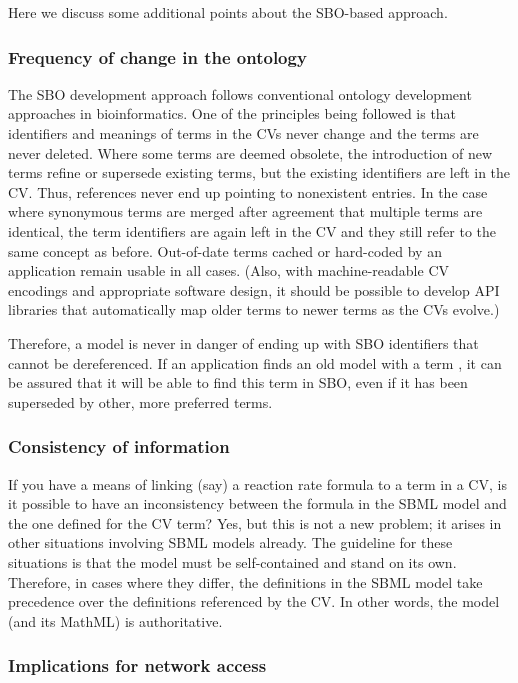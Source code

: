 Here we discuss some additional points about the SBO-based
approach.

\subsubsection{Frequency of change in the ontology}
\label{sec:sbo-frequency-of-change}

The SBO development approach follows conventional ontology
development approaches in bioinformatics.  One of the principles
being followed is that identifiers and meanings of terms in the
CVs never change and the terms are never deleted.  Where some
terms are deemed obsolete, the introduction of new terms refine or
supersede existing terms, but the existing identifiers are left in
the CV.  Thus, references never end up pointing to nonexistent
entries.  In the case where synonymous terms are merged after
agreement that multiple terms are identical, the term identifiers
are again left in the CV and they still refer to the same concept
as before.  Out-of-date terms cached or hard-coded by an
application remain usable in all cases.  (Also, with
machine-readable CV encodings and appropriate software design, it
should be possible to develop API libraries that automatically map
older terms to newer terms as the CVs evolve.)

Therefore, a model is never in danger of ending up with SBO
identifiers that cannot be dereferenced.  If an application finds
an old model with a term , it can be assured
that it will be able to find this term in SBO, even if it has been
superseded by other, more preferred terms.


\subsubsection{Consistency of information}

If you have a means of linking (say) a reaction rate formula to a
term in a CV, is it possible to have an inconsistency between the
formula in the SBML model and the one defined for the CV term?
Yes, but this is not a new problem; it arises in other situations
involving SBML models already.  The guideline for these situations
is that the model must be self-contained and stand on its own.
Therefore, in cases where they differ, the definitions in the SBML
model take precedence over the definitions referenced by the CV.
In other words, the model (and its MathML) is authoritative.


\subsubsection{Implications for network access}
\label{sec:sbo-implications-for-network-access}

